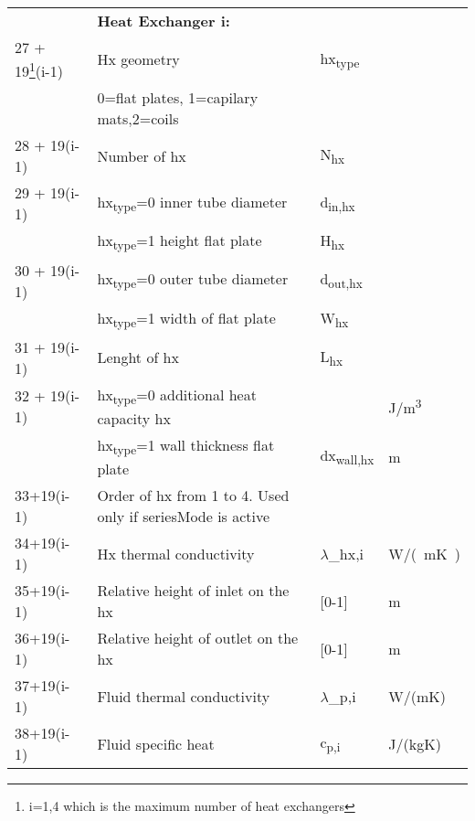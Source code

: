 \documentclass[english]{SPFReport}
\begin{document}
\begin{tabular}{| l |  m{8cm} | l | l |}
\hline
     & \textbf{Heat Exchanger i:} & & \\
  \small{ 27 + 19\footnote{i=1,4 which is the maximum number of heat exchangers}(i-1) } &Hx geometry & \si{hx_{type}}& \\  
   &0=flat plates, 1=capilary mats,2=coils &&\\
  \small{ 28 + 19(i-1)}& Number of hx & \si{N_{hx}} & \\  
  \small{ 29 + 19(i-1)}& \si{hx_{type}}=0  inner tube diameter & \si{d_{in,hx}} & \\  
                           & \si{hx_{type}}=1 height flat plate & \si{H_{hx}}& \\  
  \small{ 30 + 19(i-1)}& \si{hx_{type}}=0 outer tube diameter &\si{d_{out,hx}}& \\  
                           & \si{hx_{type}}=1  width of flat plate &\si{W_{hx}}& \\  
  \small{ 31 + 19(i-1)}& Lenght of hx  & \si{L_{hx}} & \\  
  \small{ 32 + 19(i-1)}& \si{hx_{type}}=0  additional heat capacity hx & & \si{J/m^3} \\  
                           & \si{hx_{type}}=1  wall thickness flat plate &\si{dx_{wall,hx}} & m \\  
  \small{33+19(i-1)}& Order of hx from 1 to 4. Used only if seriesMode is active  &  & \\  
  \small{34+19(i-1)}& Hx thermal conductivity  & \si{$\lambda$_{hx,i}} & \si{W/(mK)}\\
  \small{35+19(i-1)}& Relative height of inlet on the hx & [0-1] & m \\
   \small{36+19(i-1)}& Relative height of outlet on the hx & [0-1] & m \\
 
   \small{37+19(i-1)}& Fluid thermal conductivity & \si{$\lambda$_{p,i}} & W/(mK) \\
   \small{38+19(i-1)}& Fluid specific heat & \si{c_{p,i}} & J/(kgK) \\
   

\end{tabular}
\end{document}
